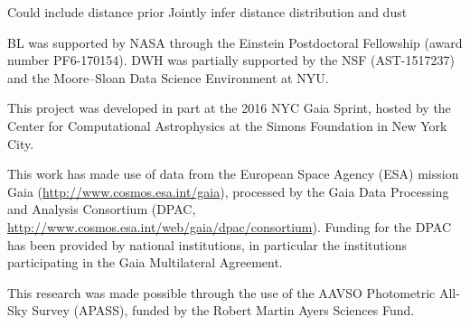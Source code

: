 \documentclass[manuscript, letterpaper]{aastex6}
\newcommand{\todo}[1]{\textcolor{blue}{[TODO: #1]}}
\begin{document}
Could include distance prior
Jointly infer distance distribution and dust



\acknowledgments

BL was supported by NASA through the Einstein Postdoctoral Fellowship (award number PF6-170154).
DWH was partially supported by the NSF (AST-1517237) and the Moore--Sloan Data Science Environment at NYU.

This project was developed in part at the 2016 NYC Gaia Sprint, hosted by the Center for Computational Astrophysics at the Simons Foundation in New York City.

This work has made use of data from the European Space Agency (ESA) mission Gaia (\url{http://www.cosmos.esa.int/gaia}), processed by the Gaia Data Processing and Analysis Consortium (DPAC, \url{http://www.cosmos.esa.int/web/gaia/dpac/consortium}). Funding for the DPAC has been provided by national institutions, in particular the institutions participating in the Gaia Multilateral Agreement.

This research was made possible through the use of the AAVSO Photometric All-Sky Survey (APASS), funded by the Robert Martin Ayers Sciences Fund.







\end{document}

